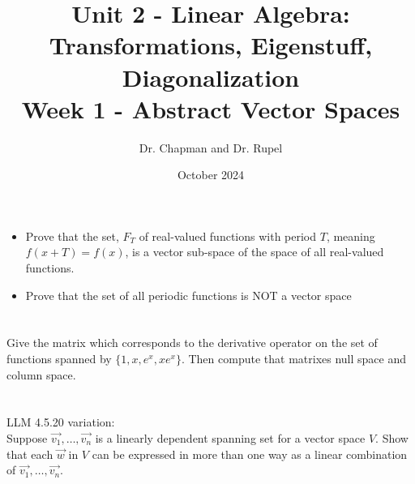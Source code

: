 \documentclass{article}
\title{Unit 2 - Linear Algebra: Transformations, Eigenstuff, Diagonalization \\ Week 1 - Abstract Vector Spaces}
\author{Dr. Chapman and Dr. Rupel}
\date{October 2024}
\begin{document}
\maketitle
\section{}
\begin{itemize}
    \item Prove that the set, $F_T$ of real-valued functions with period $T$, meaning $f(x+T) = f(x)$, is a vector sub-space of the space of all real-valued functions.
    \item Prove that the set of all periodic functions is NOT a vector space
\end{itemize}
\section{}
Give the matrix which corresponds to the derivative operator on the set of functions spanned by $\{1, x, e^x, xe^x\}$. Then compute that matrixes null space and column space.\\
\section{}
LLM 4.5.20 variation:\\
Suppose $\vec{v_1}, \ldots ,\vec{v_n}$ is a linearly dependent spanning set for a vector space $V$. Show that each $\vec{w}$ in $V$ can be expressed in more than one way as a linear combination of $\vec{v_1},\ldots, \vec{v_n}$.
\end{document}
